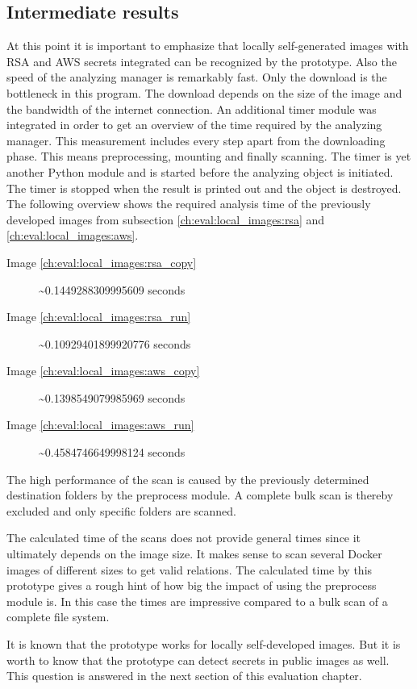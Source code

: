 \subsection{Intermediate results}
At this point it is important to emphasize that locally self-generated images with RSA and AWS secrets integrated can be recognized by the prototype.
Also the speed of the analyzing manager is remarkably fast. 
Only the download is the bottleneck in this program. 
The download depends on the size of the image and the bandwidth of the internet connection.
An additional timer module was integrated in order to get an overview of the time required by the analyzing manager.
This measurement includes every step apart from the downloading phase. This means preprocessing, mounting and finally scanning.
The timer is yet another Python module and is started before the analyzing object is initiated. 
The timer is stopped when the result is printed out and the object is destroyed.
The following overview shows the required analysis time of the previously developed images from subsection \ref{ch:eval:local_images:rsa} and \ref{ch:eval:local_images:aws}. 
\begin{description}
\item [Image \ref{ch:eval:local_images:rsa_copy}] \textasciitilde 0.1449288309995609 seconds
\item [Image \ref{ch:eval:local_images:rsa_run}] \textasciitilde 0.10929401899920776 seconds
\item [Image \ref{ch:eval:local_images:aws_copy}] \textasciitilde 0.1398549079985969 seconds
\item [Image \ref{ch:eval:local_images:aws_run}] \textasciitilde 0.4584746649998124 seconds
\end{description}
The high performance of the scan is caused by the previously determined destination folders by the preprocess module.
A complete bulk scan is thereby excluded and only specific folders are scanned.

The calculated time of the scans does not provide general times since it ultimately depends on the image size. 
It makes sense to scan several Docker images of different sizes to get valid relations.
The calculated time by this prototype gives a rough hint of how big the impact of using the preprocess module is.
In this case the times are impressive compared to a bulk scan of a complete file system.

It is known that the prototype works for locally self-developed images. 
But it is worth to know that the prototype can detect secrets in public images as well.
This question is answered in the next section of this evaluation chapter.